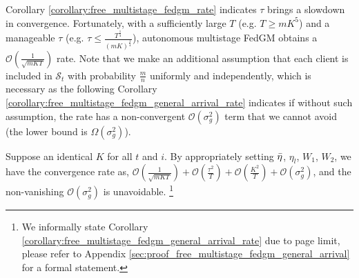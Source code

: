 \begin{remark}
Corollary \ref{corollary:free_multistage_fedgm_rate} indicates $\tau$ brings a slowdown in convergence. Fortunately, with a sufficiently large $T$ (e.g. $T\ge mK^5$) and a manageable $\tau$ (e.g. $\tau \leq \frac{T^\frac{1}{4}}{(mK)^\frac{1}{4}}$), autonomous multistage FedGM obtains a $\mathcal{O}\left(\frac{1}{\sqrt{mKT}}\right)$ rate. Note that we make an additional assumption that each client is included in $\mathcal{S}_t$ with probability $\frac{m}{n}$ uniformly and independently, which is necessary as the following Corollary \ref{corollary:free_multistage_fedgm_general_arrival_rate} indicates if without such assumption, the rate has a non-convergent $\mathcal{O}\left( \sigma_g^2 \right)$ term that we cannot avoid (the lower bound is $\Omega\left( \sigma_g^2 \right)$).
\end{remark}

\begin{corollary}
Suppose an identical $K$ for all $t$ and $i$. By appropriately setting $\Bar{\eta}$, $\eta_l$, $W_1$, $W_2$, we have the convergence rate as, $\mathcal{O}\left(\frac{1}{\sqrt{mKT}}\right)+ \mathcal{O}\left(\frac{\tau^2}{T}\right) +  \mathcal{O}\left( \frac{K^2}{T} \right) + \mathcal{O}\left( \sigma_g^2 \right)$, and the non-vanishing $\mathcal{O}\left( \sigma_g^2 \right)$ is unavoidable. \footnote{We informally state Corollary \ref{corollary:free_multistage_fedgm_general_arrival_rate} due to page limit, please refer to Appendix \ref{sec:proof_free_multistage_fedgm_general_arrival} for a formal statement.}
\label{corollary:free_multistage_fedgm_general_arrival_rate}
\end{corollary}




